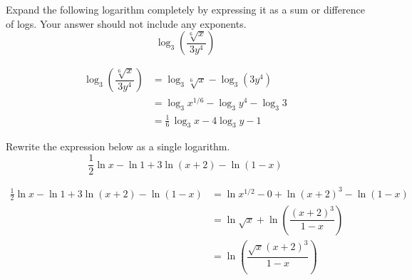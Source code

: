 \documentclass[11pt,letterpaper]{article}
\begin{document}
\newpage 





 Expand the following logarithm completely by expressing it as a sum or difference of logs. Your answer should not include any exponents.
	\[
	\log_3 \left(\dfrac{\sqrt[6]{x}}{3y^4}\right)
	\] \pspace

\sol
	\[
	\begin{aligned}
	\log_3 \left(\dfrac{\sqrt[6]{x}}{3y^4}\right)&= \log_3 \sqrt[6]{x} - \log_3(3y^4) \\[0.3cm]
	&= \log_3 x^{1/6} - \log_3 y^4 - \log_3 3 \\[0.3cm]
	&= \frac{1}{6}\, \log_3 x - 4 \log_3 y - 1
	\end{aligned}
	\]





\newpage





 Rewrite the expression below as a single logarithm. 
	\[
	\frac{1}{2} \ln x - \ln 1 + 3\ln(x+2) - \ln(1 - x)
	\] \pspace

\sol
	\[
	\begin{aligned}
	\frac{1}{2} \ln x - \ln 1 + 3\ln(x+2) - \ln(1 - x)&= \ln x^{1/2} - 0 + \ln(x + 2)^3 - \ln(1 - x) \\[0.3cm]
	&= \ln \sqrt{x} + \ln\left( \dfrac{(x + 2)^3}{1 - x} \right) \\[0.3cm]
	&= \ln\left( \dfrac{\sqrt{x} (x + 2)^3}{1 - x} \right)
	\end{aligned}
	\]


\end{document}

